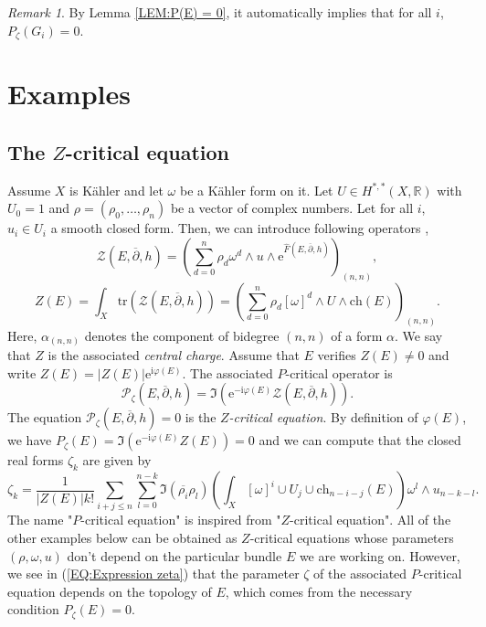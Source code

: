 \documentclass{article}
\theoremstyle{remark}
\newtheorem*{remark}{Remark}
\theoremstyle{definition}
\newcommand{\R}{\mathbb{R}}
\newcommand{\tr}{\mathrm{tr}}
\renewcommand{\i}{\boldsymbol{\mathrm{i}}}
\newcommand{\e}{\boldsymbol{\mathrm{e}}}
\newcommand{\abs}[1]{\left| #1 \right|}
\newcommand{\mP}{\mathcal{P}}
\newcommand{\dbar}{\overline{\partial}}
\newcommand{\ch}{\mathrm{ch}}
\renewcommand{\leq}{\leqslant}
\begin{document}
\begin{remark}
    By Lemma \ref{LEM:P(E) = 0}, it automatically implies that for all $i$, $P_\zeta(G_i) = 0$.
\end{remark}

\section{Examples}\label{SEC:Exemples}

\subsection{The $Z$-critical equation}

Assume $X$ is Kähler and let $\omega$ be a Kähler form on it. Let $U \in H^{*,*}(X,\R)$ with $U_0 = 1$ and $\rho = (\rho_0,\ldots,\rho_n)$ be a vector of complex numbers. Let for all $i$, $u_i \in U_i$ a smooth closed form. Then, we can introduce following operators \cite[Definition 2.22]{DMS},
$$
\mathcal{Z}(E,\dbar,h) = \left(\sum_{d = 0}^n \rho_d\omega^d \wedge u \wedge \e^{\hat{F}(E,\dbar,h)}\right)_{(n,n)},
$$
$$
Z(E) = \int_X \tr(\mathcal{Z}(E,\dbar,h)) = \left(\sum_{d = 0}^n \rho_d[\omega]^d \wedge U \wedge \ch(E)\right)_{(n,n)}.
$$
Here, $\alpha_{(n,n)}$ denotes the component of bidegree $(n,n)$ of a form $\alpha$. We say that $Z$ is the associated \textit{central charge}. Assume that $E$ verifies $Z(E) \neq 0$ and write $Z(E) = \abs{Z(E)}\e^{\i\varphi(E)}$. The associated $P$-critical operator is
$$
\mP_\zeta(E,\dbar,h) = \Im(\e^{-\i\varphi(E)}\mathcal{Z}(E,\dbar,h)).
$$
The equation $\mP_\zeta(E,\dbar,h) = 0$ is the \textit{$Z$-critical equation}. By definition of $\varphi(E)$, we have $P_\zeta(E) = \Im(\e^{-\i\varphi(E)}Z(E)) = 0$ and we can compute that the closed real forms $\zeta_k$ are given by
\begin{equation}\label{EQ:Expression zeta}
    \zeta_k = \frac{1}{\abs{Z(E)}k!}\sum_{i + j \leq n}\sum_{l = 0}^{n - k} \Im(\overline{\rho_i}\rho_l)\left(\int_X [\omega]^i \cup U_j \cup \ch_{n - i - j}(E)\right)\omega^l \wedge u_{n - k - l}.
\end{equation}
The name "$P$-critical equation" is inspired from "$Z$-critical equation". All of the other examples below can be obtained as $Z$-critical equations whose parameters $(\rho,\omega,u)$ don't depend on the particular bundle $E$ we are working on. However, we see in (\ref{EQ:Expression zeta}) that the parameter $\zeta$ of the associated $P$-critical equation depends on the topology of $E$, which comes from the necessary condition $P_\zeta(E) = 0$.
\end{document}
